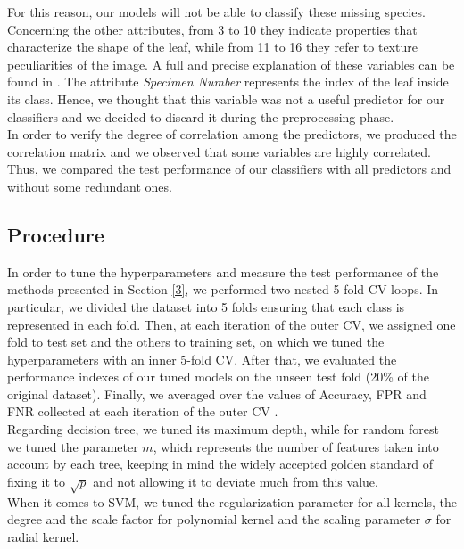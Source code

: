 \documentclass{article}
\begin{document}
For this reason, our models will not be able to classify these missing species.
\\ Concerning the other attributes, from 3 to 10 they indicate properties that characterize the shape of the leaf, while from 11 to 16 they refer to texture peculiarities of the image. A full and precise explanation of these variables can be found in \cite{silva}. The attribute \textit{Specimen Number} represents the index of the leaf inside its class. Hence, we thought that this variable was not a useful predictor for our classifiers and we decided to discard it during the preprocessing phase.
\\In order to verify the degree of correlation among the predictors, we produced the correlation matrix and we observed that some variables are highly correlated. Thus, we compared the test performance of our classifiers with all predictors and without some redundant ones.

\subsection{Procedure}
In order to tune the hyperparameters and measure the test performance of the methods presented in Section \ref{3}, we performed two nested 5-fold CV loops. 
In particular, we divided the dataset into 5 folds ensuring that each class is represented in each fold. Then, at each iteration of the outer CV, we assigned one fold to test set and the others to training set, on which we tuned the hyperparameters with an inner 5-fold CV. After that, we evaluated the performance indexes of our tuned models on the unseen test fold (20\% of the original dataset). Finally, we averaged over the values of Accuracy, FPR and FNR collected at each iteration of the outer CV \cite{cv}.
\\Regarding decision tree, we tuned its maximum depth, while for random forest we tuned the parameter $m$, which represents the number of features taken into account by each tree, keeping in mind the widely accepted golden standard of fixing it to $\sqrt{p}$ \cite{book} and not allowing it to deviate much from this value.
\\When it comes to SVM, we tuned the regularization parameter for all kernels, the degree and the scale factor for polynomial kernel and the scaling parameter $\sigma$ for radial kernel.
\end{document}
